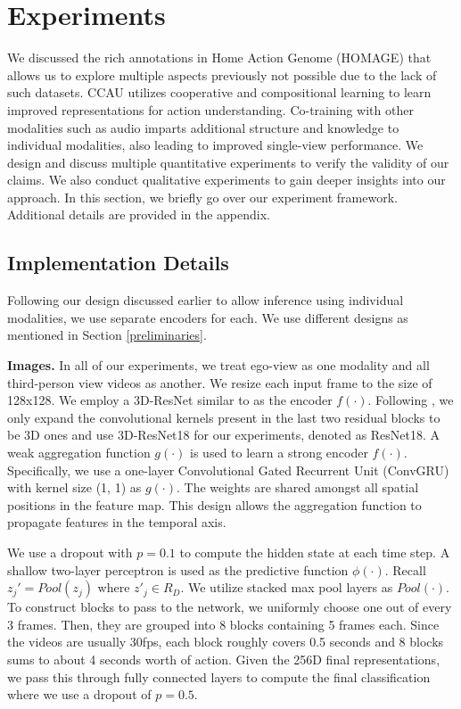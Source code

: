\documentclass[final]{cvpr}
\begin{document}
    

\section{Experiments}

We discussed the rich annotations in Home Action Genome (HOMAGE) that allows us to explore multiple aspects previously not possible due to the lack of such datasets. CCAU utilizes cooperative and compositional learning to learn improved representations for action understanding. Co-training with other modalities such as audio imparts additional structure and knowledge to individual modalities, also leading to improved single-view performance. We design and discuss multiple quantitative experiments to verify the validity of our claims. We also conduct qualitative experiments to gain deeper insights into our approach. In this section, we briefly go over our experiment framework. Additional details are provided in the appendix.





\subsection{Implementation Details}
Following our design discussed earlier to allow inference using individual modalities, we use separate encoders for each. We use different designs as mentioned in Section \ref{preliminaries}.

\noindent\textbf{Images.} In all of our experiments, we treat ego-view as one modality and all third-person view videos as another. We resize each input frame to the size of 128x128. We employ a 3D-ResNet similar to \cite{hara2018can} as the encoder $f(\cdot)$. Following \cite{dpc}, we only expand the convolutional kernels present in the last two residual blocks to be 3D ones and use 3D-ResNet18 for our experiments, denoted as ResNet18. A weak aggregation function $g(\cdot)$ is used to learn a strong encoder $f(\cdot)$. Specifically, we use a one-layer Convolutional Gated Recurrent Unit (ConvGRU) with kernel size (1, 1) as $g(\cdot)$. The weights are shared amongst all spatial positions in the feature map. This design allows the aggregation function to propagate features in the temporal axis. 

We use a dropout \cite{dropout} with $p = 0.1$ to compute the hidden state at each time step. A shallow two-layer perceptron is used as the predictive function $\phi(\cdot)$. Recall $z_j' = Pool(z_j)$ where $z'_j \in R_D$. We utilize stacked max pool layers as $Pool(\cdot)$. To construct blocks to pass to the network, we uniformly choose one out of every 3 frames. Then, they are grouped into 8 blocks containing 5 frames each. Since the videos are usually 30fps, each block roughly covers 0.5 seconds and 8 blocks sums to about 4 seconds worth of action. Given the 256D final representations, we pass this through fully connected layers to compute the final classification where we use a dropout of $p=0.5$.
\end{document}
